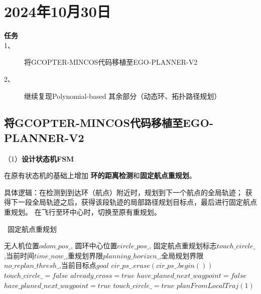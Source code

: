 \newpage
\section{2024年10月30日}
\begin{tcolorbox}[cyan]
    \begin{description}
        \item[\large \textbf{任务}]
        \item[1、] 将GCOPTER-MINCOS代码移植至EGO-PLANNER-V2
        \item[2、] 继续复现Polynomial-based 其余部分（动态环、拓扑路径规划）
    \end{description}
\end{tcolorbox}
\subsection{将GCOPTER-MINCOS代码移植至EGO-PLANNER-V2}
（1）\textbf{设计状态机FSM}


在原有状态机的基础上增加
\textbf{环的距离检测}和\textbf{固定航点重规划}。

具体逻辑：在检测到到达环（航点）附近时，规划到下一个航点的全局轨迹；
获得下一段全局轨迹之后，获得该段轨迹的局部路径规划目标点，最后进行固定航点重规划。
在飞行至环中心时，切换至原有重规划。
\begin{algorithm}[htbp]  
    \caption{\ 固定航点重规划}  
    \label{fsm}  
    \begin{algorithmic}[1]   
      \Require  无人机位置$odom\_pos\_$, 圆环中心位置$circle\_pos\_$, 固定航点重规划标志$touch\_circle\_$,当前时间$time\_now\_$,重规划界限$planning\_horizen\_$,全局规划界限$no\_replan\_thresh\_$,当前目标点$goal$
    \State {}
            \State $cir\_ps\_.erase(cir\_ps\_.begin())$
            \State $touch\_circle\_ = false$
            \State $already\_cross = true$
            \State $have\_planed\_next\_waypoint = false$
        \EndIf
            \State $have\_planed\_next\_waypoint = true$
            \State $touch\_circle\_ = true$
            \State $planFromLocalTraj(1)$
            \EndIf
        \EndIf
    \end{algorithmic}  
  \end{algorithm}


